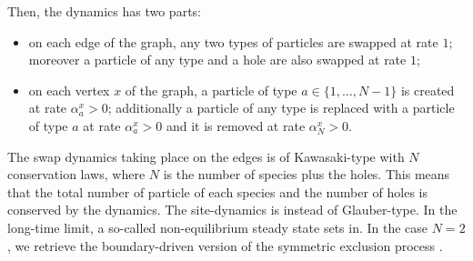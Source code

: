 \documentclass[10pt]{article}
\numberwithin{equation}{section}
\numberwithin{equation}{subsection}
\newcommand{\fra}[1]{\textcolor[rgb]{0,0,1}{#1}}
\begin{document}
Then, the dynamics has two parts: 
\begin{itemize}
\item
on each edge of the graph, any two types of particles are swapped at rate $1$;
moreover a particle of any type and a hole are also swapped at rate $1$; 
\item
on each vertex $x$ of the graph, a particle of type $a \in \{1,\ldots,N-1\}$ is created  at rate $\alpha_a^x >0$;
additionally a \fra{particle} of any type is replaced with a
particle of type $a$ at rate $\alpha_a^x >0$ and it is removed at rate $\alpha_N^x >0$.
\end{itemize}
The swap dynamics taking place on the edges is of Kawasaki-type 
with $N$ conservation laws, \fra{where $N$ is the number of species plus the holes. This means that the total number of particle of each species and the number of holes is conserved by the dynamics.}
The site-dynamics is instead of Glauber-type. 
In the long-time limit, a so-called non-equilibrium
steady state sets in.
In the case $N=2$, we retrieve the  boundary-driven version of the symmetric exclusion process \cite{schutzSandow,carinci2013duality}.
\end{document}

